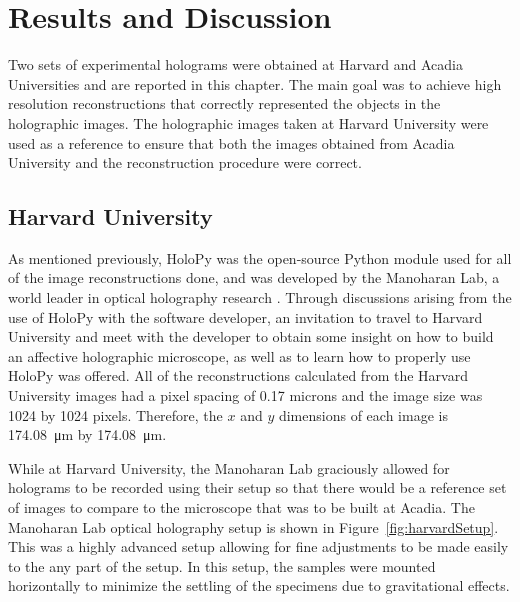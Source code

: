 %
%

\chapter{Results and Discussion} \label{chap:Results}

Two sets of experimental holograms were obtained at Harvard and Acadia
Universities and are reported in this chapter. The main goal was to achieve
high resolution 
reconstructions that correctly represented the objects in the holographic
images.
The holographic images taken at Harvard University were
used as a reference to ensure that both the images obtained from Acadia
University and the reconstruction procedure were correct.

\section{Harvard University}

As mentioned previously, HoloPy was the open-source Python module used for all
of the image reconstructions
done, and was developed by the Manoharan Lab, a world leader in optical
holography research \cite{Manoharan}. 
Through discussions arising from the use of HoloPy with the software developer, 
an invitation to travel to
Harvard University and meet with the developer to obtain some insight on how to
build an affective holographic microscope, as well as to learn how to properly
use HoloPy was offered.
All of the reconstructions calculated from the Harvard University images had a pixel
spacing of 0.17 microns and the image size was 1024 by 1024 pixels.
Therefore, the $x$ and $y$ dimensions of each image is \SI{174.08}{\micro\meter} by \SI{174.08}{\micro\meter}.
%
%

While at
Harvard University, the Manoharan Lab graciously allowed for holograms to be
recorded using their setup so that there would be a reference set of images to
compare to the microscope
that was to be built at Acadia. The Manoharan Lab optical holography setup is shown in
Figure~\ref{fig:harvardSetup}. This was a highly advanced setup allowing for
fine adjustments to be made easily to the any part of the setup. In this setup,
the samples were mounted horizontally to minimize the settling of the specimens
due to gravitational effects.



